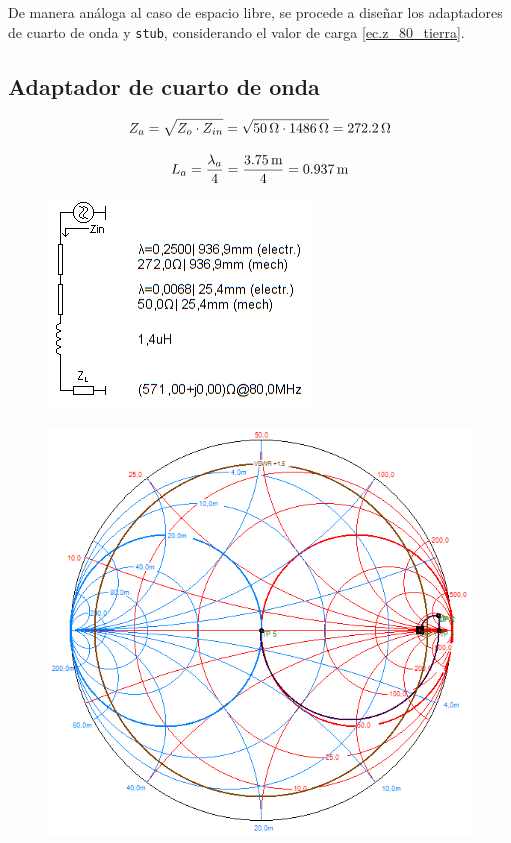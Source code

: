 De manera análoga al caso de espacio libre, se procede a diseñar los adaptadores de cuarto de onda y \texttt{stub}, considerando el valor de carga \ref{ec.z_80_tierra}.

\subsection{Adaptador de cuarto de onda}
\begin{equation*}
	\centering
	Z_a = \sqrt{Z_o \cdot Z_{in}} = \sqrt{ \SI{50}{\ohm} \cdot \SI{1486}{\ohm} } = \SI{272.2}{\ohm}
	\label{ec.z_a_4}
\end{equation*}	

\begin{equation*}
	\centering
	L_a = \frac{\lambda_a}{4} = \frac{ \SI{3.75}{\meter} }{4} = \SI{0.937}{\meter}
	\label{ec.L_a_4}
\end{equation*}


\begin{figure}[H]
	\centering
	\includegraphics[scale=0.83]{imagenes/smith_4_tierra_esq.png}
	\label{fig.smith_4_tierra_esq}
\end{figure}

\begin{figure}[H]
	\centering
	\includegraphics[scale=0.63]{imagenes/smith_4_tierra.png}
	\label{fig.smith_4_tierra}
\end{figure}


